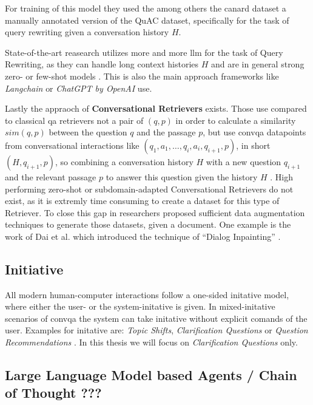 For training of this model they used the among others the canard dataset \cite{elgohary_can_2019} a manually annotated version of the QuAC dataset, specifically for the task of query rewriting given a conversation history $H$.

State-of-the-art reasearch utilizes more and more \gls{llm} for the task of Query Rewriting, as they can handle long context histories $H$ and are in general strong zero- or few-shot models \cite{mao_large_2023}. This is also the main approach frameworks like \textit{Langchain} \cite{noauthor_question_nodate} or \textit{ChatGPT by OpenAI} \cite{noauthor_chatgpt_2023} use. 


Lastly the appraoch of \textbf{Conversational Retrievers} exists. Those use compared to classical \gls{qa} retrievers not a pair of $(q,p)$ in order to calculate a similarity $sim(q,p)$ between the question $q$ and the passage $p$, but use \gls{convqa} datapoints from conversational interactions like $(q_1, a_1, \dots, q_i, a_i, q_{i+1}, p)$, in short $(H, q_{i+1}, p)$, so combining a conversation history $H$ with a new question $q_{i+1}$ and the relevant passage $p$ to answer this question given the history $H$ \cite{gao_neural_2022,dai_dialog_2022}. High performing zero-shot or subdomain-adapted Conversational Retrievers do not exist, as it is extremly time consuming to create a dataset for this type of Retriever. To close this gap in researchers proposed sufficient data augmentation techniques to generate those datasets, given a document. One example is the work of Dai et al. \cite{dai_dialog_2022} which introduced the technique of \enquote{Dialog Inpainting} \cite{dai_dialog_2022}.  

\subsection{Initiative}
\label{subsec:cqa_initiative}

All modern human-computer interactions follow a one-sided initative model, where either the user- or the system-initative is given. In mixed-initative scenarios of \gls{convqa} the system can take initative without explicit comands of the user. Examples for initative are: \textit{Topic Shifts}, \textit{Clarification Questions} or \textit{Question Recommendations} \cite{zamani_conversational_2023}. In this thesis we will focus on \textit{Clarification Questions} only.



\subsection{Large Language Model based Agents / Chain of Thought ???}
\label{subsec:cqa_llm_agents}

